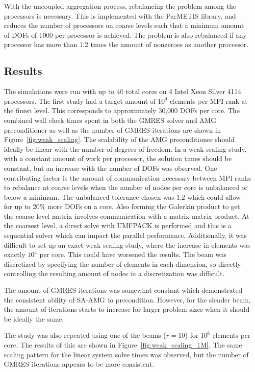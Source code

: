 With the uncoupled aggregation process, rebalancing the problem among the processors is necessary. This is implemented with the ParMETIS library, and reduces the number of processors on coarse levels such that a minimum amount of DOFs of 1000 per processor is achieved. The problem is also rebalanced if any processor has more than 1.2 times the amount of nonzeroes as another processor.

\subsection{Results}
The simulations were run with up to 40 total cores on 4 Intel Xeon Silver 4114 processors. The first study had a target amount of $10^4$ elements per MPI rank at the finest level. This corresponds to approximately 30,000 DOFs per core. The combined wall clock times spent in both the GMRES solver and AMG preconditioner as well as the number of GMRES iterations are shown in Figure~\ref{fig:weak_scaling}. The scalability of the AMG preconditioner should ideally be linear with the number of degrees of freedom. In a weak scaling study, with a constant amount of work per processor, the solution times should be constant, but an increase with the number of DOFs was observed. One contributing factor is the amount of communication necessary between MPI ranks to rebalance at coarse levels when the number of nodes per core is unbalanced or below a minimum. The unbalanced tolerance chosen was 1.2 which could allow for up to 20\% more DOFs on a core. Also forming the Galerkin product to get the coarse-level matrix involves communication with a matrix-matrix product. At the coarsest level, a direct solve with UMFPACK is performed and this is a sequential solver which can impact the parallel performance. Additionally, it was difficult to set up an exact weak scaling study, where the increase in elements was exactly $10^4$ per core. This could have worsened the results. The beam was discretized by specifying the number of elements in each dimension, so directly controlling the resulting amount of nodes in a discretization was difficult.

The amount of GMRES iterations was somewhat constant which demonstrated the consistent ability of SA-AMG to precondition. However, for the slender beam, the amount of iterations starts to increase for larger problem sizes when it should be ideally the same.

The study was also repeated using one of the beams ($r = 10$) for $10^6$ elements per core. The results of this are shown in Figure~\ref{fig:weak_scaling_1M}. The same scaling pattern for the linear system solve times was observed, but the number of GMRES iterations appears to be more consistent.

